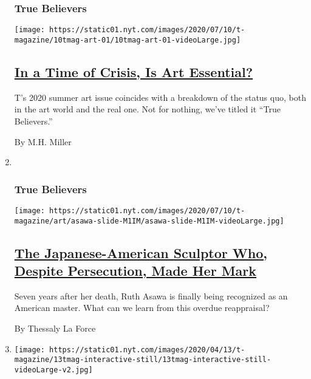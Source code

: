 \begin{enumerate}
{  \subsubsection{True Believers}\label{true-believers-9}}

  \texttt{[image: https://static01.nyt.com/images/2020/07/10/t-magazine/10tmag-art-01/10tmag-art-01-videoLarge.jpg]}

  \hypertarget{in-a-time-of-crisis-is-art-essential}{%
  \subsection{\texorpdfstring{\href{/2020/07/20/t-magazine/museums-galleries-open-art.html}{In
  a Time of Crisis, Is Art
  Essential?}}{In a Time of Crisis, Is Art Essential?}}\label{in-a-time-of-crisis-is-art-essential}}

  T's 2020 summer art issue coincides with a breakdown of the status
  quo, both in the art world and the real one. Not for nothing, we've
  titled it ``True Believers.''

  By M.H. Miller
\item ~
  \hypertarget{true-believers-10}{%
  \subsubsection{True Believers}\label{true-believers-10}}

  \texttt{[image: https://static01.nyt.com/images/2020/07/10/t-magazine/art/asawa-slide-M1IM/asawa-slide-M1IM-videoLarge.jpg]}

  \hypertarget{the-japanese-american-sculptor-who-despite-persecution-made-her-mark}{%
  \subsection{\texorpdfstring{\href{/2020/07/20/t-magazine/ruth-asawa.html}{The
  Japanese-American Sculptor Who, Despite Persecution, Made Her
  Mark}}{The Japanese-American Sculptor Who, Despite Persecution, Made Her Mark}}\label{the-japanese-american-sculptor-who-despite-persecution-made-her-mark}}

  Seven years after her death, Ruth Asawa is finally being recognized as
  an American master. What can we learn from this overdue reappraisal?

  By Thessaly La Force
\item
  \texttt{[image: https://static01.nyt.com/images/2020/04/13/t-magazine/13tmag-interactive-still/13tmag-interactive-still-videoLarge-v2.jpg]}


\end{enumerate}
